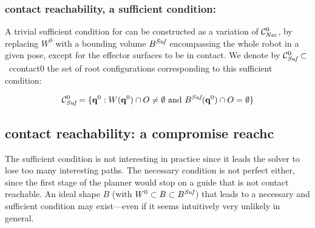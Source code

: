 
\subsubsection*{contact reachability, a sufficient condition:}
A trivial sufficient condition for  can be constructed as a variation of $\mathcal{C}^0_{\textrm{\it Nec}}$, by replacing $W^0$ with a bounding volume $B^{\textrm{\it Suf}}$ encompassing the whole robot in a given pose, except for the effector surfaces to be in contact. We denote by \mbox{$\mathcal{C}^0_{\textrm{\it Suf}} \subset $ \gls{ccontact0}} the set of root configurations corresponding to this sufficient condition:

\begin{equation}
\mathcal{C}^0_{\textrm{\it Suf}} = \{ \mathbf{q}^0 : W(\mathbf{q}^{0}) \cap O \neq \emptyset \text{ and } B^{\textrm{\it Suf}}(\mathbf{q}^{0}) \cap O = \emptyset \} %
\end{equation}


\subsection{contact reachability: a compromise \gls{reachc}}
The sufficient condition is not interesting in practice since it leads the solver to lose too many interesting paths. The necessary condition is not perfect either, since the first stage of the planner would stop on a guide that is not \gls{contact reachable}. 
An ideal shape $B$ (with $W^0 \subset B \subset B^{\textrm{\it Suf}}$) that leads to a necessary and sufficient condition may exist---even if it seems intuitively very unlikely in general. 

